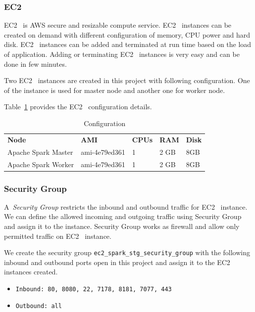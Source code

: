 \subsubsection{EC2}

EC2~\cite{hid-sp18-511-www-ec2} is AWS secure and resizable compute
service. EC2~\cite{hid-sp18-511-www-ec2} instances can be created on
demand with different configuration of memory, CPU power and hard
disk. EC2~\cite{hid-sp18-511-www-ec2} instances can be added and
terminated at run time based on the load of application. Adding or
terminating EC2~\cite{hid-sp18-511-www-ec2} instances is very easy and
can be done in few minutes.

Two EC2~\cite{hid-sp18-511-www-ec2} instances are created in this
project with following configuration. One of the instance is used for
master node and another one for worker node.

Table~\ref{t:ec2-configuration} provides the
EC2~\cite{hid-sp18-511-www-ec2} configuration details.

\begin{table}[]
	\centering \caption{Configuration}\label{t:ec2-configuration}
  \begin{tabular}{lllll} \textbf{Node}
	& \textbf{AMI} & \textbf{CPUs} & \textbf{RAM}
	& \textbf{Disk}\\ Apache Spark Master & ami-4e79ed361 & 1 & 2
	GB & 8GB\\ Apache Spark Worker & ami-4e79ed361 & 1 & 2 GB & 8GB\\ 
  \end{tabular}
\end{table}

\subsubsection{Security Group}

A~\emph{Security Group} restricts the inbound and outbound traffic
for EC2~\cite{hid-sp18-511-www-ec2} instance.  We can define the
allowed incoming and outgoing traffic using Security Group and assign
it to the instance. Security Group works as firewall and allow only
permitted traffic on EC2~\cite{hid-sp18-511-www-ec2} instance.

We create the security group \verb|ec2_spark_stg_security_group| with
the following inbound and outbound ports open in this project and
assign it to the EC2~\cite{hid-sp18-511-www-ec2} instances created.

\begin{itemize}
	\item \verb|Inbound: 80, 8080, 22, 7178, 8181, 7077, 443|
	\item \verb|Outbound: all|
	
\end{itemize}

